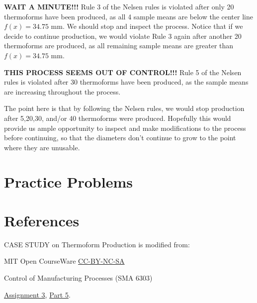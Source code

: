 \documentclass{ximera}
\begin{document}
\textbf{WAIT A MINUTE!!!}  Rule 3 of the Nelsen rules is violated after only 20 thermoforms have been produced, as all 4 sample means are below the center line $f(x)=34.75$ mm.  We should stop and inspect the process.  Notice that if we decide to continue production, we would violate Rule 3 again after another 20 thermoforms are produced, as all remaining sample means are greater than $f(x)=34.75$ mm.

\textbf{THIS PROCESS SEEMS OUT OF CONTROL!!!}  Rule 5 of the Nelsen rules is violated after 30 thermoforms have been produced, as the sample means are increasing throughout the process.

The point here is that by following the Nelsen rules, we would stop production after 5,20,30, and/or 40 thermoforms were produced.  Hopefully this would provide us ample opportunity to inspect and make modifications to the process before continuing, so that the diameters don't continue to grow to the point where they are unusable.


\section*{Practice Problems}

\section*{References}
CASE STUDY on Thermoform Production is modified from:

MIT Open CourseWare \href{https://creativecommons.org/licenses/by-nc-sa/4.0/}{CC-BY-NC-SA}

Control of Manufacturing Processes (SMA 6303)

\href{https://ocw.mit.edu/courses/2-830j-control-of-manufacturing-processes-sma-6303-spring-2008/resources/ps3/}{Assignment 3}, \href{https://ocw.mit.edu/courses/2-830j-control-of-manufacturing-processes-sma-6303-spring-2008/resources/35/}{Part 5}. 
\end{document}
